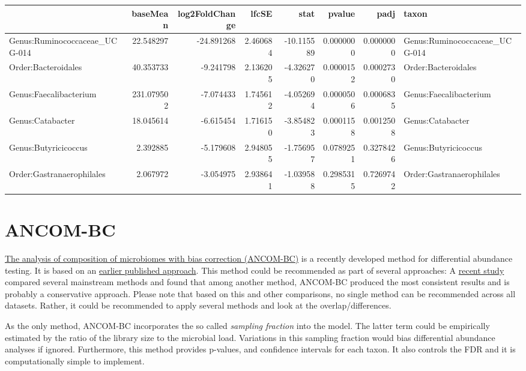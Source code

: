 \documentclass[
]{book}
\begin{document}
\begin{table}
\centering
\begin{tabular}{l|r|r|r|r|r|r|l}
\hline
  & baseMean & log2FoldChange & lfcSE & stat & pvalue & padj & taxon\\
\hline
Genus:Ruminococcaceae\_UCG-014 & 22.548297 & -24.891268 & 2.460684 & -10.115589 & 0.0000000 & 0.0000000 & Genus:Ruminococcaceae\_UCG-014\\
\hline
Order:Bacteroidales & 40.353733 & -9.241798 & 2.136205 & -4.326270 & 0.0000152 & 0.0002730 & Order:Bacteroidales\\
\hline
Genus:Faecalibacterium & 231.079502 & -7.074433 & 1.745612 & -4.052694 & 0.0000506 & 0.0006835 & Genus:Faecalibacterium\\
\hline
Genus:Catabacter & 18.045614 & -6.615454 & 1.716150 & -3.854823 & 0.0001158 & 0.0012508 & Genus:Catabacter\\
\hline
Genus:Butyricicoccus & 2.392885 & -5.179608 & 2.948055 & -1.756957 & 0.0789251 & 0.3278426 & Genus:Butyricicoccus\\
\hline
Order:Gastranaerophilales & 2.067972 & -3.054975 & 2.938641 & -1.039588 & 0.2985315 & 0.7269742 & Order:Gastranaerophilales\\
\hline
\end{tabular}
\end{table}

\hypertarget{ancom-bc}{%
\section{ANCOM-BC}\label{ancom-bc}}

\href{https://www.nature.com/articles/s41467-020-17041-7}{The analysis of composition of microbiomes with bias correction (ANCOM-BC)}
is a recently developed method for differential abundance testing. It is based on an
\href{https://www.ncbi.nlm.nih.gov/pmc/articles/PMC4450248/}{earlier published approach}.
This method could be recommended as part of several approaches:
A \href{https://www.biorxiv.org/content/10.1101/2021.05.10.443486v1.full}{recent study}
compared several mainstream methods and found that among another method, ANCOM-BC produced
the most consistent results and is probably a conservative approach. Please note that
based on this and other comparisons, no single method can be recommended across all datasets.
Rather, it could be recommended to apply several methods and look at the overlap/differences.

As the only method, ANCOM-BC incorporates the so called \emph{sampling fraction} into the model.
The latter term could be empirically estimated by the ratio of the library size to the microbial load.
Variations in this sampling fraction would bias differential abundance analyses if ignored.
Furthermore, this method provides p-values, and confidence intervals for each taxon.
It also controls the FDR and it is computationally simple to implement.
\end{document}
